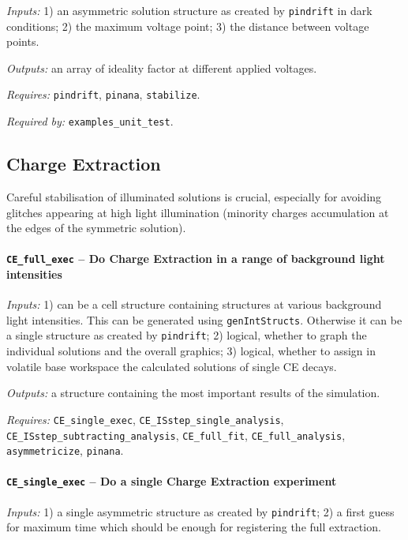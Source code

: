 		\textit{Inputs:} 1) an asymmetric solution structure as created by \texttt{pin\-drift} in dark conditions;
		2) the maximum voltage point;
		3) the distance between voltage points.

		\textit{Outputs:} an array of ideality factor at different applied voltages.

		\textit{Requires:} \texttt{pin\-drift}, \texttt{pinana}, \texttt{stabilize}.

		\textit{Required by:} \texttt{examples\_unit\_test}.


	\subsection{Charge Extraction}\label{dd_ce}
		Careful stabilisation of illuminated solutions is crucial, especially for avoiding glitches appearing at high light illumination (minority charges accumulation at the edges of the symmetric solution).

		\paragraph{\texttt{CE\_full\_exec} -- Do Charge Extraction in a range of background light intensities}

		\textit{Inputs:} 1) can be a cell structure containing structures at various background light intensities.
		This can be generated using \texttt{gen\-Int\-Structs}.
		Otherwise it can be a single structure as created by \texttt{pin\-drift};
		2) logical, whether to graph the individual solutions and
		the overall graphics;
		3) logical, whether to assign in volatile base
		workspace the calculated solutions of single CE decays.

		\textit{Outputs:} a structure containing the most important results of the simulation.

		\textit{Requires:} \texttt{CE\_single\_exec}, \texttt{CE\_ISstep\_single\_analysis},   \texttt{CE\_ISstep\_subtracting\_analysis}, \texttt{CE\_full\_fit}, \texttt{CE\_full\_analysis},  \texttt{asymmetricize}, \texttt{pinana}.


		\paragraph{\texttt{CE\_single\_exec} -- Do a single Charge Extraction experiment}

		\textit{Inputs:} 1) a single asymmetric structure as created by \texttt{pin\-drift};
		2) a first guess for maximum time which should be enough for registering the full extraction.

